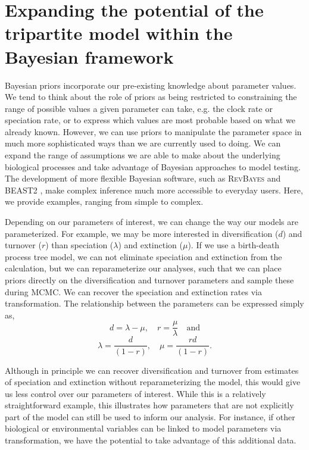 \documentclass[11pt]{article}
\newcommand{\edit}[1]{{\textcolor{red}{#1}}} %
\begin{document}
\section{Expanding the potential of the tripartite model within the Bayesian framework}

Bayesian priors incorporate our pre-existing knowledge about parameter values. %
We tend to think about the role of priors as being restricted to  constraining the range of possible values a given parameter can take, e.g. the clock rate or speciation rate, or to express which values are most probable based on what we already known.
However, we can use priors to manipulate the parameter space in much more sophisticated ways than we are currently used to doing.
We can expand the range of assumptions we are able to make about the underlying biological processes and take advantage of Bayesian approaches to model testing.
The development of more flexible Bayesian software, such as \textsc{RevBayes} \citep{Hoehna2014b, Hoehna2016b} and BEAST2 \citep{BEAST2}, make complex inference much more accessible to everyday users.
Here, we provide examples, ranging from simple to complex.


Depending on our parameters of interest, we can change the way our models are parameterized.
For example, we may be more interested in diversification ($d$) and turnover ($r$) than speciation ($\lambda$) and extinction ($\mu$).
If we use a birth-death process tree model, we can not eliminate speciation and extinction from the calculation, but we can reparameterize our analyses, such that we can place priors directly on the diversification and turnover parameters and sample these during MCMC. We can recover the speciation and extinction rates via transformation.
The relationship between the parameters can be expressed simply as, 
$$d = \lambda - \mu, \quad r = \frac{\mu}{\lambda} \quad \textrm{and} $$ 
$$\lambda = \frac{d}{(1-r)}, \quad \mu = \frac{rd}{(1 - r)}.$$

Although in principle we can recover diversification and turnover from estimates of speciation and extinction without reparameterizing the model, this would give us less control over our parameters of interest. 
While this is a relatively straightforward example, this illustrates how parameters that are not explicitly part of the model can still be used to inform our analysis. 
For instance, if other biological or environmental variables %
can be linked to model parameters via transformation, we have the potential to take advantage of this additional data.
\end{document}
